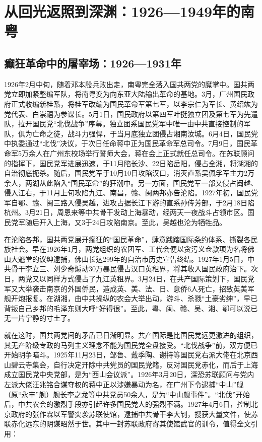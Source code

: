 \chapter{从回光返照到深渊：1926—1949年的南粤}

\section{癫狂革命中的屠宰场：1926—1931年}

\indent 1926年2月中旬，随着邓本殷兵败出走，南粤完全落入国共两党的魔掌中。国共两党立即加紧整编军队，将南粤变为向东亚大陆输出革命的基地。3月，广州国民政府正式收编新桂系，将桂军改编为国民革命军第七军，以李宗仁为军长、黄绍竑为党代表、白崇禧为参谋长。5月1日，国民政府以第四军叶挺独立团及第七军为先遣队，拉开国民党“北伐战争”序幕。独立团系国民党军中唯一由中共直接控制的军队，俱为亡命之徒，战斗力强悍，于当月底独立团侵占湘南汝城。6月4日，国民党中执委通过“北伐”决议，于次日任命蒋中正为国民革命军总司令。7月9日，国民革命军5万余人在广州东校场举行誓师大会，蒋在会上正式就任总司令。在苏联顾问的指挥下，国民党军进展迅速，于11月陷长沙、22日陷岳阳，侵占全湘，将湖湘的自治彻底扼杀。随后，国民党军于10月10日攻陷汉口，消灭直系吴佩孚军主力2万余人，两湖从此陷入“国民革命”的狂潮中。另一方面，国民党军一部又侵占闽越、侵入江右，于11月上旬攻陷九江、南昌，赣、闽两邦亦告沦陷。1927年初，国民党军自鄂、赣、闽三路入侵吴越，进攻占据长江下游的直系孙传芳部，于2月18日陷杭州。3月21日，周恩来等中共骨干发动上海暴动，经两天一夜战斗占领市区。国民党军随后开入上海，又3于24日攻陷南京。至此，吴越也沦为牺牲品。

在沦陷各邦，国共两党展开癫狂的“国民革命”，肆意践踏国际条约体系、撕裂各民族社会。早在1926年1月，两党组织的农团军、工代会便以贪污义仓款项为名将佛山大魁堂的议绅逮捕，佛山长达299年的自治市历史宣告终结。1927年1月5日，中共骨干李立三、刘少奇煽动30万暴民侵占汉口英租界，将其收入国民政府治下。次日，两党又以同样方式侵占了九江英租界。3月24日，在共产国际策划下，国民党军又大举袭击南京的外国侨民，造成英、美、法、日、意侨6人死亡，招致英美军舰开炮报复。在湖湘，由中共操纵的农会大举出动，游斗、杀戮“土豪劣绅”，早已背叛自己乡邦的毛泽东则大呼“好得很”。至此，粤、闽、赣、吴、湘、鄂可以说已无一片宁静的寸土了。

就在这时，国共两党间的矛盾已日渐明显。共产国际是比国民党远更激进的组织，其无产阶级专政的马列主义理念不能为国民党全盘接受。“北伐战争”前，双方便已开始明争暗斗。1925年11月23日，邹鲁、戴季陶、谢持等国民党右派大佬在北京西山碧云寺集会，自行决定开除中共党员的国民党籍，反对国民党赤化，而后于上海成立国民党中央党部，是为“西山会议派”。1926年3月20日，深恐苏联顾问与党内左派大佬汪兆铭合谋夺权的蒋中正以涉嫌暴动为名，在广州下令逮捕“中山”舰（原“永丰”舰）舰长李之龙等中共党员50余人，是为“中山舰事件”。“北伐”开始后，中共农会的激烈手段亦引起许多国民党人的强烈不满。1927年4月6日，控制北京政府的张作霖以军警突袭苏联使馆，逮捕中共骨干李大钊，搜获大量文件，使苏联赤化远东的阴谋昭然于世。其中一封苏联政府寄其使馆武官的训令，值得全文引用：

